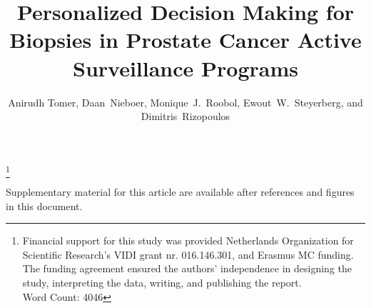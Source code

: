\documentclass[Review,sagev,times]{sagej}
\begin{document}

\title{Personalized Decision Making for Biopsies in Prostate Cancer Active Surveillance Programs}

\author{Anirudh Tomer, Daan~Nieboer, Monique~J.~Roobol, Ewout~W.~Steyerberg, and Dimitris~Rizopoulos}







\maketitle

\footnote{Financial support for this study was provided Netherlands Organization for Scientific Research's VIDI grant nr. 016.146.301, and Erasmus MC funding. The funding agreement ensured the authors’ independence in designing the study, interpreting the data, writing, and publishing the report.\\Word Count: 4046}
\thefootnote








\begin{sm}
Supplementary material for this article are available after references and figures in this document.
\end{sm} 



\end{document}
